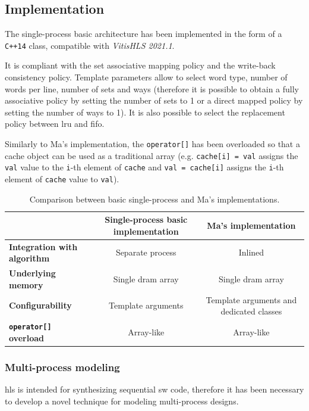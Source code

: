 \documentclass[11pt,a4paper,oneside]{memoir}
\begin{document}
\subsection{Implementation}
The single-process basic architecture has been implemented in the form of a
\texttt{C++14} class, compatible with \emph{Vitis\texttrademark HLS 2021.1}.

It is compliant with the set associative mapping policy and the write-back
consistency policy.
Template parameters allow to select word type, number of words per line, number
of sets and ways (therefore it is possible to obtain a fully associative policy
by setting the number of sets to 1 or a direct mapped policy by setting the
number of ways to 1).
It is also possible to select the replacement policy between \acl{lru} and
\acl{fifo}.

Similarly to Ma's implementation, the \texttt{operator[]} has been overloaded
so that a cache object can be used as a traditional array (e.g.
\texttt{cache[i] = val} assigns the \texttt{val} value to the \texttt{i}-th
element of \texttt{cache} and \texttt{val = cache[i]} assigns the \texttt{i}-th
element of \texttt{cache} value to \texttt{val}).

\begin{table}
	\begin{center}
		\begin{tabularx}{\textwidth}{LCC}
			\hline
			& \textbf{Single-process basic implementation} &
			\textbf{Ma's implementation} \\
			\hline
			\textbf{Integration with algorithm} & Separate process &
			Inlined \\
			\textbf{Underlying memory} & Single \ac{dram} array &
			Single \ac{dram} array \\
			\textbf{Configurability} & Template arguments &
			Template arguments and dedicated classes \\
			\textbf{\texttt{operator[]} overload} & Array-like &
			Array-like \\
			\hline
		\end{tabularx}
	\end{center}
	\caption{Comparison between basic single-process and Ma's
	implementations.}
	\label{tab:basic_vs_liang}
\end{table}

\subsubsection{Multi-process modeling}
\ac{hls} is intended for synthesizing sequential \acl{sw} code, therefore it has
been necessary to develop a novel technique for modeling multi-process designs.
\end{document}
